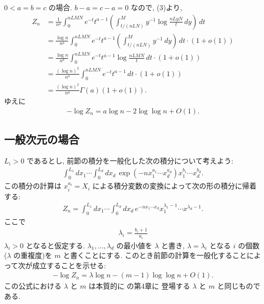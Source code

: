 \documentclass[12pt,twoside]{jarticle}
\theoremstyle{jplain}
\theoremstyle{jplain}
\theoremstyle{jplain}
\numberwithin{theorem}{section}
\numberwithin{equation}{section}
\numberwithin{figure}{section}
\numberwithin{table}{section}
\begin{document}
$0<a=b=c$ の場合. $b-a=c-a=0$ なので, (3)より,
\begin{align*}
Z_n
&=
\frac{1}{n^a}\int_0^{nLMN} e^{-t}t^{a-1}
\left(
\int_{t/(nLN)}^M y^{-1} \log\frac{nLyN}{t}\,dy
\right)\,dt
\\ &
=
\frac{\log n}{n^a}\int_0^{nLMN} e^{-t}t^{a-1}
\left(
\int_{t/(nLN)}^M y^{-1} \,dy
\right)\,dt\cdot(1+o(1))
\\ &
=
\frac{\log n}{n^a}\int_0^{nLMN} e^{-t}t^{a-1}
\log\frac{nLMN}{t}
\,dt\cdot(1+o(1))
\\ &
=
\frac{(\log n)^2}{n^a}\int_0^{nLMN} e^{-t}t^{a-1}\,dt\cdot(1+o(1))
\\ &
=
\frac{(\log n)^2}{n^a}\Gamma(a)(1+o(1)).
\end{align*}
ゆえに
\begin{align*}
-\log Z_n = a\log n - 2\log\log n + O(1).
\end{align*}


\subsection{一般次元の場合}

$L_i>0$ であるとし,
前節の積分を一般化した次の積分について考えよう:
\begin{align*}
\int_0^{L_1}dx_1\cdots\int_0^{L_d}dx_d\,
\exp\left(-n x_1^{a_1}\cdots x_d^{a_d}\right) x_1^{b_1}\cdots x_d^{b_d}.
\end{align*}
この積分の計算は $x_i^{a_i}=X_i$ による積分変数の変換によって次の形の積分に帰着する:
\begin{align*}
Z_n = \int_0^{L_1}dx_1\cdots\int_0^{L_d}dx_d\, e^{-nx_1\cdots x_d}
x_1^{\lambda_1-1}\cdots x^{\lambda_d-1}.
\end{align*}
ここで
\begin{align*}
\lambda_i = \frac{b_i+1}{a_i}
\end{align*}
$\lambda_i>0$ となると仮定する.
$\lambda_1,\ldots,\lambda_d$ の最小値を $\lambda$ と書き,
$\lambda=\lambda_i$ となる $i$ の個数($\lambda$ の重複度)を $m$ と書くことにする.
このとき前節の計算を一般化することによって次が成立することを示せる:
\begin{align*}
-\log Z_n = \lambda \log n - (m-1)\log\log n + O(1).
\end{align*}
この公式における $\lambda$ と $m$ は本質的に \cite{watanabe-2012} の第4章に
登場する $\lambda$ と $m$ と同じものである.
\end{document}
